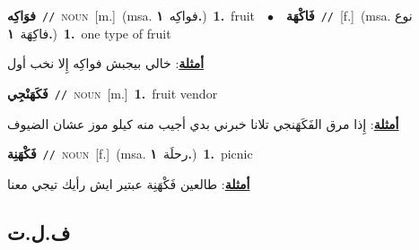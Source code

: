 \documentclass[10pt,a4paper,twoside]{article} %
\begin{document}
\begin{multicols}{2}
{\setlength\topsep{0pt}\textbf{\foreignlanguage{arabic}{فوَاكِه}}\ {\color{gray}\texttt{//}\color{black}}\ \textsc{noun}\ [m.]\ \color{gray}(msa. \foreignlanguage{arabic}{فواكِه}~\foreignlanguage{arabic}{\textbf{١.}})\color{black}\ \textbf{1.}~fruit\ \ $\bullet$\ \ \setlength\topsep{0pt}\textbf{\foreignlanguage{arabic}{فَاكْهَة}}\ {\color{gray}\texttt{//}\color{black}}\ [f.]\ \color{gray}(msa. \foreignlanguage{arabic}{نوع فاكِهَة}~\foreignlanguage{arabic}{\textbf{١.}})\color{black}\ \textbf{1.}~one type of fruit\  \begin{flushright}\color{gray}\foreignlanguage{arabic}{\textbf{\underline{\foreignlanguage{arabic}{أمثلة}}}: خالي بيجبش فواكِه إِلا نخب أول}\end{flushright}\color{black}} \vspace{2mm}

{\setlength\topsep{0pt}\textbf{\foreignlanguage{arabic}{فَكَهَنْجِي}}\ {\color{gray}\texttt{//}\color{black}}\ \textsc{noun}\ [m.]\ \textbf{1.}~fruit vendor\  \begin{flushright}\color{gray}\foreignlanguage{arabic}{\textbf{\underline{\foreignlanguage{arabic}{أمثلة}}}: إِذا مرق الفَكَهَنجي تلانا خبرني بدي أجيب منه كيلو موز عشان الضيوف}\end{flushright}\color{black}} \vspace{2mm}

{\setlength\topsep{0pt}\textbf{\foreignlanguage{arabic}{فَكْهَنِة}}\ {\color{gray}\texttt{//}\color{black}}\ \textsc{noun}\ [f.]\ \color{gray}(msa. \foreignlanguage{arabic}{رحلَة}~\foreignlanguage{arabic}{\textbf{١.}})\color{black}\ \textbf{1.}~picnic\  \begin{flushright}\color{gray}\foreignlanguage{arabic}{\textbf{\underline{\foreignlanguage{arabic}{أمثلة}}}: طالعين فَكْهَنِة عبتير ايش رأيك تيجي معنا}\end{flushright}\color{black}} \vspace{2mm}

\vspace{-3mm}
\subsection*{\color{blue}\foreignlanguage{arabic}{ف.ل.ت}\color{blue}{}} 


\end{multicols}
\end{document}
